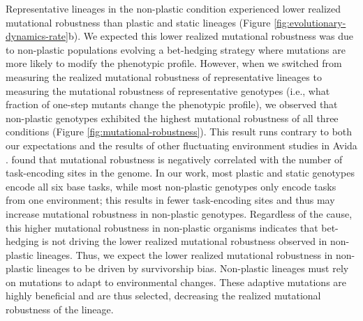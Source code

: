 Representative lineages in the non-plastic condition experienced lower realized mutational robustness than plastic and static lineages (Figure \ref{fig:evolutionary-dynamics-rate}b).
We expected this lower realized mutational robustness was due to non-plastic populations evolving a bet-hedging strategy where mutations are more likely to modify the phenotypic profile. 
However, when we switched from measuring the realized mutational robustness of representative lineages to measuring the mutational robustness of representative genotypes (i.e., what fraction of one-step mutants change the phenotypic profile), we observed that non-plastic genotypes exhibited the highest mutational robustness of all three conditions (Figure \ref{fig:mutational-robustness}).
This result runs contrary to both our expectations and the results of other fluctuating environment studies in Avida \citep{canino-koning_fluctuating_2019}.
\cite{canino-koning_fluctuating_2019} found that mutational robustness is negatively correlated with the number of task-encoding sites in the genome.
In our work, most plastic and static genotypes encode all six base tasks, while most non-plastic genotypes only encode tasks from one environment; this results in fewer task-encoding sites and thus may increase mutational robustness in non-plastic genotypes. %
Regardless of the cause, this higher mutational robustness in non-plastic organisms indicates that bet-hedging is not driving the  lower realized mutational robustness observed in non-plastic lineages.
Thus, we expect the lower realized mutational robustness in non-plastic lineages to be driven by survivorship bias. 
Non-plastic lineages must rely on mutations to adapt to environmental changes. 
These adaptive mutations are highly beneficial and are thus selected, decreasing the realized mutational robustness of the lineage. 


